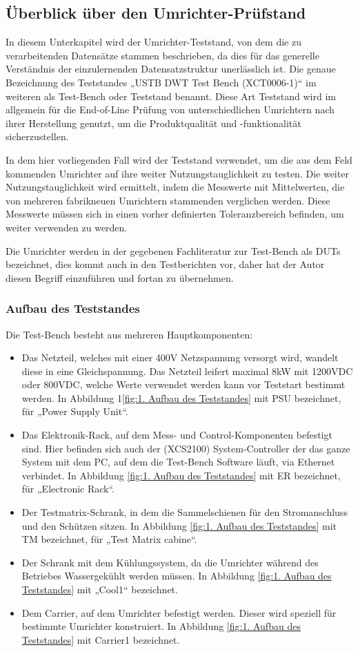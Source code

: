 
\subsection{Überblick über den Umrichter-Prüfstand}
In diesem Unterkapitel wird der Umrichter-Teststand, von dem die zu verarbeitenden Datensätze stammen beschrieben,
da dies für das generelle Verständnis der einzulernenden Datensatzstruktur unerlässlich ist.
Die genaue Bezeichnung des Teststandes „USTB DWT Test Bench (XCT0006-1)“ im weiteren als Test-Bench oder Teststand benannt.
Diese Art Teststand wird im allgemein für die End-of-Line Prüfung von unterschiedlichen Umrichtern nach ihrer Herstellung genutzt,
um die Produktqualität und -funktionalität sicherzustellen.\cite*{Main_Manuel_USTB2018}

In dem hier vorliegenden Fall wird der Teststand verwendet, um die aus dem Feld kommenden Umrichter auf ihre weiter Nutzungstauglichkeit zu testen.
Die weiter Nutzungstauglichkeit wird ermittelt, indem die Messwerte mit Mittelwerten, die von mehreren fabrikneuen Umrichtern stammenden verglichen werden.
Diese Messwerte müssen sich in einen vorher definierten Toleranzbereich befinden, um weiter verwenden zu werden.

Die Umrichter werden in der gegebenen Fachliteratur zur Test-Bench als \ac{DUTs} bezeichnet, dies kommt auch in den Testberichten vor,
daher hat der Autor diesen Begriff einzuführen und fortan zu übernehmen.

\subsubsection{Aufbau des Teststandes}
Die Test-Bench besteht aus mehreren Hauptkomponenten:
\begin{itemize}
\item Das Netzteil, welches mit einer 400V Netzspannung versorgt wird, wandelt diese in eine Gleichspannung. Das Netzteil leifert maximal 8kW mit 1200VDC oder 800VDC, welche Werte verwendet werden kann vor Teststart bestimmt werden. In Abbildung 1\ref{fig:1. Aufbau des Teststandes} mit PSU bezeichnet, für „Power Supply Unit“.
\item Das Elektronik-Rack, auf dem Mess- und Control-Komponenten befestigt sind. Hier befinden sich auch der (XCS2100) System-Controller der das ganze System mit dem PC, auf dem die Test-Bench Software läuft, via Ethernet verbindet. In Abbildung \ref{fig:1. Aufbau des Teststandes} mit ER bezeichnet, für „Electronic Rack“.
\item Der Testmatrix-Schrank, in dem die Sammelschienen für den Stromanschluss und den Schützen sitzen. In Abbildung \ref{fig:1. Aufbau des Teststandes} mit TM bezeichnet, für „Test Matrix cabine“.
\item Der Schrank mit dem Kühlungssystem, da die Umrichter während des Betriebes Wassergekühlt werden müssen. In Abbildung \ref{fig:1. Aufbau des Teststandes} mit „Cool1“ bezeichnet.
\item Dem Carrier, auf dem Umrichter befestigt werden. Dieser wird speziell für bestimmte Umrichter konstruiert. In Abbildung \ref{fig:1. Aufbau des Teststandes} mit Carrier1 bezeichnet.

\end{itemize}


